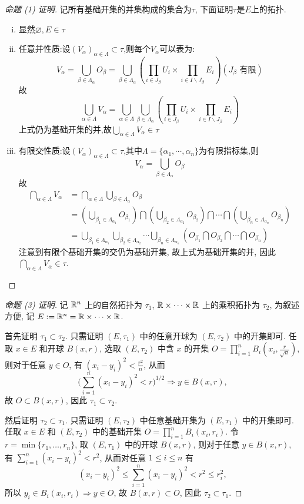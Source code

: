 \begin{proof}[命题 (1) 证明]
记所有基础开集的并集构成的集合为$\tau$, 下面证明$\tau$是$E$上的拓扑.
\begin{enumerate}[(i)]
\item 显然$\varnothing,E\in\tau$
\item 任意并性质:设$(V_{\alpha})_{\alpha\in\Lambda}\subset\tau$,则每个$V_{\alpha}$可以表为:
\[V_{\alpha}=\bigcup_{\beta\in\Lambda_{\alpha}}O_{\beta}=\bigcup_{\beta\in\Lambda_{\alpha}}\left(\prod_{i\in J_{\beta}}U_i\times\prod_{i\in I\backslash J_{\beta}}E_i\right)(J_{\beta}\text{\ 有限})\]
故
\[\bigcup_{\alpha\in\Lambda}V_{\alpha}=\bigcup_{\alpha\in\Lambda}\bigcup_{\beta\in\Lambda_{\alpha}}\left(\prod_{i\in J_{\beta}}U_i\times\prod_{i\in I\backslash J_{\beta}}E_i\right)\]
上式仍为基础开集的并,故$\bigcup_{\alpha\in\Lambda}V_{\alpha}\in\tau$
\item 有限交性质:设$\left(V_{\alpha}\right)_{\alpha\in\Lambda}\subset\tau$,其中$\Lambda=\{\alpha_1,\cdots,\alpha_n\}$为有限指标集,则
\[V_{\alpha}=\bigcup_{\beta\in\Lambda_{\alpha}}O_{\beta}\]
故
\begin{align*}
    \bigcap_{\alpha\in\Lambda}V_{\alpha}
    &=\bigcap_{\alpha\in\Lambda}\bigcup_{\beta\in\Lambda_{\alpha}}O_{\beta}\\
    &=\left(\bigcup_{\beta_1\in\Lambda_{\alpha_1}}O_{\beta_1}\right)\bigcap\left(\bigcup_{\beta_2\in\Lambda_{\alpha_2}}O_{\beta_2}\right)\bigcap\cdots\bigcap\left(\bigcup_{\beta_n\in\Lambda_{\alpha_n}}O_{\beta_n}\right)\\
    &=\bigcup_{\beta_1\in\Lambda_{\alpha_1}}\bigcup_{\beta_2\in\Lambda_{\alpha_2}}\cdots\bigcup_{\beta_n\in\Lambda_{\alpha_n}}\left(O_{\beta_1}\bigcap O_{\beta_2}\bigcap\cdots\bigcap O_{\beta_n}\right)
\end{align*}
注意到有限个基础开集的交仍为基础开集, 故上式为基础开集的并, 因此$\bigcap_{\alpha\in\Lambda}V_{\alpha}\in\tau$.
\end{enumerate}
\end{proof}

\begin{proof}[命题 (3) 证明]
记 $\mathbb{R}^n$ 上的自然拓扑为 $\tau_1$, $\mathbb{R}\times\cdots\times\mathbb{R}$ 上的乘积拓扑为 $\tau_2$, 
为叙述方便, 记 $E:=\mathbb{R}^n=\mathbb{R}\times\cdots\times\mathbb{R}$.

首先证明 $\tau_1\subset\tau_2$. 只需证明 $(E,\tau_1)$ 中的任意开球为 $(E,\tau_2)$ 中的开集即可.
任取 $x\in E$ 和开球 $B(x,r)$, 选取 $(E,\tau_2)$ 中含 $x$ 的开集 $O=\prod_{i=1}^nB_i(x_i,\frac{r}{\sqrt{n}})$,
则对于任意 $y\in O$, 有 $(x_i-y_i)^2<\frac{r^2}{n}$, 从而
\[\biggl(\sum_{i=1}^n(x_i-y_i)^2<r\biggr)^{1/2}\Rightarrow y\in B(x,r),\]
故 $O\subset B(x,r)$, 因此 $\tau_1\subset\tau_2$.

然后证明 $\tau_2\subset\tau_1$. 只需证明 $(E,\tau_2)$ 中任意基础开集为 $(E,\tau_1)$
中的开集即可. 任取 $x\in E$ 和 $(E,\tau_2)$ 中的基础开集 $O=\prod_{i=1}^nB_i(x_i,r_i)$.
令 $r=\min\{r_1,\dots,r_n\}$, 取 $(E,\tau_1)$ 中的开球 $B(x,r)$, 则对于任意 $y\in B(x,r)$,
有 $\sum_{i=1}^n(x_i-y_i)^2<r^2$, 从而对任意 $1\leq i\leq n$ 有
\[(x_i-y_i)^2\leq\sum_{i=1}^n(x_i-y_i)^2<r^2\leq r_i^2,\]
所以 $y_i\in B_i(x_i,r_i)\Rightarrow y\in O$, 故 $B(x,r)\subset O$, 因此 $\tau_2\subset\tau_1$.
\end{proof}

